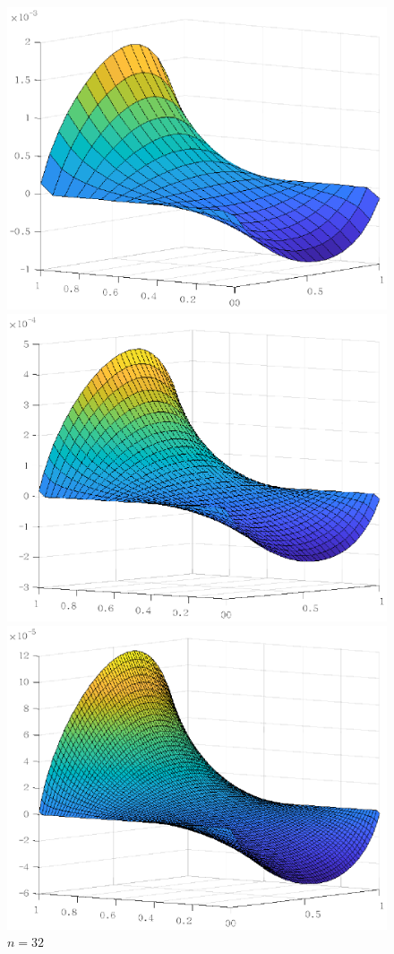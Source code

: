 \documentclass[lang=cn,10pt]{elegantbook}
\begin{document}
\begin{figure}[H]
  \centering
  \begin{minipage}[t]{0.24\linewidth}
      \centering
      \includegraphics[width=0.8\linewidth]{figure/2-3-1.eps}
      \caption*{$n=16$}
  \end{minipage}
  \begin{minipage}[t]{0.24\linewidth}
    \centering
    \includegraphics[width=0.8\linewidth]{figure/2-3-2.eps}
    \caption*{$n=32$}
  \end{minipage}
  \begin{minipage}[t]{0.24\linewidth}
    \centering
    \includegraphics[width=0.8\linewidth]{figure/2-3-3.eps}

\end{minipage}
\end{figure}
\end{document}
